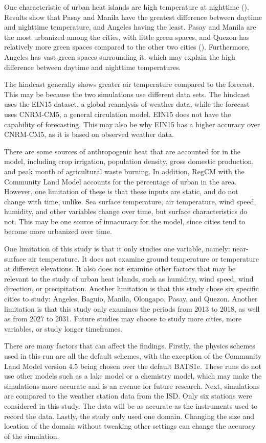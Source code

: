 	One characteristic of urban heat islands are high temperature at nighttime (\cite{Oke2017urban}).
	Results show that Pasay and Manila have the greatest difference between daytime and nighttime temperature, and Angeles having the least.
	Pasay and Manila are the most urbanized among the cities, with little green spaces,
	and Quezon has relatively more green spaces compared to the other two cities (\cite{Bilang2022}).
	Furthermore, Angeles has vast green spaces surrounding it, which may explain the high difference between daytime and nighttime temperatures.

	The hindcast generally shows greater air temperature compared to the forecast.
	This may be because the two simulations use different data sets.
	The hindcast uses the EIN15 dataset, a global reanalysis of weather data, while the forecast uses CNRM-CM5, a general circulation model.
	EIN15 does not have the capability of forecasting.
	This may also be why EIN15 has a higher accuracy over CNRM-CM5, as it is based on observed weather data.

	There are some sources of anthropogenic heat that are accounted for in the model, including crop irrigation, population density, gross domestic production, and peak month of agricultural waste burning.
	In addition, RegCM with the Community Land Model accounts for the percentage of urban in the area.
	However, one limitation of these is that these inputs are static, and do not change with time, unlike.
	Sea surface temperature, air temperature, wind speed, humidity, and other variables change over time, but surface characteristics do not.
	This may be one source of innacuracy for the model, since cities tend to become more urbanized over time.
	
	One limitation of this study is that it only studies one variable, namely: near-surface air temperature.
	It does not examine ground temperature or temperature at different elevations.
	It also does not examine other factors that may be relevant to the study of urban heat islands, such as humidity, wind speed, wind direction, or precipitation. 
	Another limitation is that this study chose six specific cities to study: Angeles, Baguio, Manila, Olongapo, Pasay, and Quezon.
	Another limitation is that this study only examines the periods from 2013 to 2018, as well as from 2027 to 2031.
	Future studies may choose to study more cities, more variables, or study longer timeframes.
	
	There are many factors that can affect the findings. 
	Firstly, the physics schemes used in this run are all the default schemes, with the exception of the Community Land Model version 4.5 being chosen over the default BATS1e. 
	These runs do not use other models such as a lake model or a chemistry model, which may make the simulations more accurate and is an avenue for future research.
	Next, simulations are compared to the weather station data from the ISD.
	Only six stations were considered in this study.
	The data will be as accurate as the instruments used to record the data.
	Lastly, the study only used one domain.
	Changing the size and location of the domain without tweaking other settings can change the accuracy of the simulation.